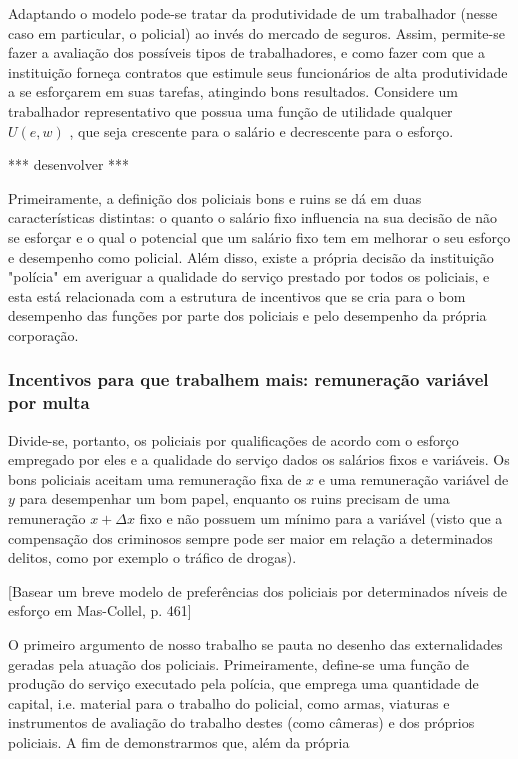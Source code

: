 \documentclass[
	article,			%
	12pt,				%
	oneside,			%
	a4paper,			%
	english,			%
	brazil,				%
	]{abntex2}
\begin{document}
Adaptando o modelo pode-se tratar da produtividade de um trabalhador (nesse caso em particular, o policial) ao invés do mercado de seguros. Assim, permite-se fazer a avaliação dos possíveis tipos de trabalhadores, e como fazer com que a instituição forneça contratos que estimule seus funcionários de alta produtividade a se esforçarem em suas tarefas, atingindo bons resultados. Considere um trabalhador representativo que possua uma função de utilidade qualquer $U(e,w)$ , que seja crescente para o salário e decrescente para o esforço.

*** desenvolver ***


Primeiramente, a definição dos policiais bons e ruins se dá em duas características distintas: o quanto o salário fixo influencia na sua decisão de não se esforçar e o qual o potencial que um salário fixo tem em melhorar o seu esforço e desempenho como policial. Além disso, existe a própria decisão da instituição "polícia" em averiguar a qualidade do serviço prestado por todos os policiais, e esta está relacionada com a estrutura de incentivos que se cria para o bom desempenho das funções por parte dos policiais e pelo desempenho da própria corporação.



\subsubsection*{Incentivos para que trabalhem mais: remuneração variável por multa}


Divide-se, portanto, os policiais por qualificações de acordo com o esforço empregado por eles e a qualidade do serviço dados os salários fixos e variáveis. Os bons policiais aceitam uma remuneração fixa de $x$ e uma remuneração variável de $y$ para desempenhar um bom papel, enquanto os ruins precisam de uma remuneração $x + \Delta x$ fixo e não possuem um mínimo para a variável (visto que a compensação dos criminosos sempre pode ser maior em relação a determinados delitos, como por exemplo o tráfico de drogas).

[Basear um breve modelo de preferências dos policiais por determinados níveis de esforço em Mas-Collel, p. 461]

O primeiro argumento de nosso trabalho se pauta no desenho das externalidades geradas pela atuação dos policiais. Primeiramente, define-se uma função de produção do serviço executado pela polícia, que emprega uma quantidade de capital, i.e. material para o trabalho do policial, como armas, viaturas e instrumentos de avaliação do trabalho destes (como câmeras) e dos próprios policiais. A fim de demonstrarmos que, além da própria 
\end{document}
